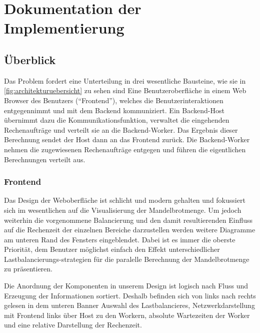 \section{Dokumentation der Implementierung}



\subsection{Überblick}

Das Problem fordert eine Unterteilung in drei wesentliche Bausteine, wie sie in \autoref{fig:architekturuebersicht} zu sehen sind
Eine Benutzeroberfläche in einem Web Browser des Benutzers (“Frontend”), welches die Benutzerinteraktionen entgegennimmt und mit dem Backend kommuniziert.
Ein Backend-Host übernimmt dazu die Kommunikationsfunktion, verwaltet die eingehenden Rechenaufträge und verteilt sie an die Backend-Worker. Das Ergebnis dieser Berechnung sendet der Host dann an das Frontend zurück.
Die Backend-Worker nehmen die zugewiesenen Rechenaufträge entgegen und führen die eigentlichen Berechnungen verteilt aus.

\subsubsection{Frontend}

Das Design der Weboberfläche ist schlicht und modern gehalten und fokussiert sich im wesentlichen auf die Visualisierung der Mandelbrotmenge. Um jedoch weiterhin die vorgenommene Balancierung und den damit resultierenden Einfluss auf die Rechenzeit der einzelnen Bereiche darzustellen werden weitere Diagramme am unteren Rand des Fensters eingeblendet. Dabei ist es immer die oberste Priorität, dem Benutzer möglichst einfach den Effekt unterschiedlicher Lastbalancierungs-strategien für die paralelle Berechnung der Mandelbrotmenge zu präsentieren.

Die Anordnung der Komponenten in unserem Design ist logisch nach Fluss und Erzeugung der Informationen sortiert. Deshalb befinden sich von links nach rechts gelesen in dem unteren Banner Auswahl des Lastbalancieres, Netzwerkdarstellung mit Frontend links über Host zu den Workern, absolute Wartezeiten der Worker und eine relative Darstellung der Rechenzeit.

